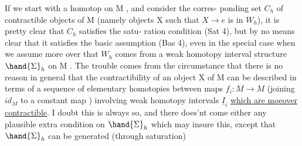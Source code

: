 If we start with a homotop   on M , and consider the corres-%
ponding set $C_h$ of contractible  objects of M (namely objects X
such that $X \to e$ is in $W_h$), it is pretty clear that $C_h$ satisfies the satu-%
ration condition (Sat 4), but by no means clear that it satisfies the
basic assumption (Bas 4), even in the special case when we assume more
over that $W_h$ comes from a weak homotopy interval structure $\hand{\Sigma}_h$ on M .
The trouble comes from the circumstance that there is no reason in general
that the contractibility of an object X of M can be described in terms of
 a sequence of elementary homotopies between maps $f_i : M \to M$
(joining $id_M$ to a constant map ) involving weak homotopy intervals $\underline{I}_i$
\uline{which are moeover contractible}.  I doubt this is always so, and
there does'nt come either any plausible extra condition on $\hand{\Sigma}_h$ which may
insure this, except  that $\hand{\Sigma}_h$ can be generated (through saturation)

